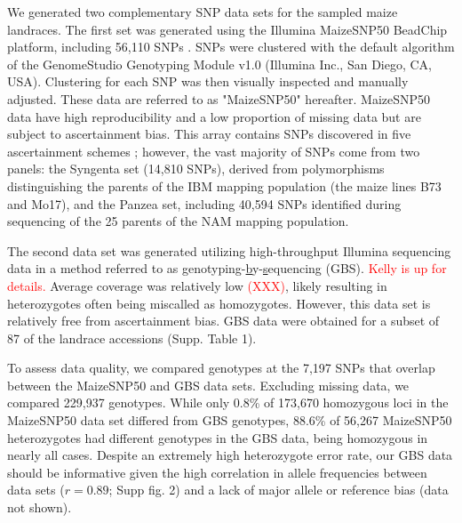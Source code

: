 We generated two complementary SNP data sets for the sampled maize landraces. 
The first set was generated using the Illumina MaizeSNP50 BeadChip platform, including 56,110
SNPs \cite[]{Ganal_2011_22174790}.  SNPs were clustered with the default algorithm of the GenomeStudio Genotyping Module v1.0 (Illumina Inc., San Diego, CA, USA).   
Clustering for each SNP was then visually inspected and manually adjusted.  
These data are referred to as "MaizeSNP50" hereafter.  
MaizeSNP50 data have high reproducibility and a low proportion of missing data but are subject to ascertainment bias. 
This array contains SNPs discovered in five ascertainment schemes \cite[]{Ganal_2011_22174790}; however, the vast majority of SNPs come from two panels: the Syngenta set (14,810 SNPs), derived from polymorphisms distinguishing the parents of the IBM mapping population (the maize lines B73 and Mo17), and the Panzea set, including 40,594 SNPs identified during sequencing of the 25 parents of the NAM mapping population.  

The second data set was generated utilizing high-throughput Illumina sequencing data in a method referred to as \underline{g}enotyping-\underline{b}y-\underline{s}equencing (GBS).  \textcolor{red}{Kelly is up for details.}
Average coverage was relatively low \textcolor{red}{(XXX)}, likely resulting in heterozygotes often being miscalled as homozygotes.  However, this data set is relatively free from ascertainment bias.       
GBS data were obtained for a subset of 87 of the landrace accessions (Supp. Table 1). 

To assess data quality, we compared genotypes at the 7,197 SNPs that overlap between the MaizeSNP50 and GBS data sets. 
Excluding missing data, we compared 229,937 genotypes. 
While only 0.8\% of 173,670 homozygous loci in the MaizeSNP50 data set differed from GBS genotypes, 88.6\% of 56,267 MaizeSNP50 heterozygotes had different genotypes in the GBS data, being homozygous in nearly all cases. 
Despite an extremely high heterozygote error rate, our GBS data should be informative given the high correlation in allele frequencies between data sets ($r=0.89$; Supp fig. 2) and a lack of major allele or reference bias (data not shown).
%
%

